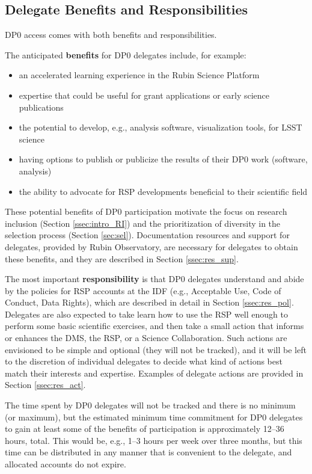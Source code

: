 \documentclass[DM,lsstdraft,authoryear,toc]{lsstdoc}
\begin{document}
\subsection{Delegate Benefits and Responsibilities}\label{ssec:intro_del}

DP0 access comes with both benefits and responsibilities.

The anticipated {\bf benefits} for DP0 delegates include, for example:
\begin{itemize}
\item an accelerated learning experience in the Rubin Science Platform
\item expertise that could be useful for grant applications or early science publications
\item the potential to develop, e.g., analysis software, visualization tools, for LSST science 
\item having options to publish or publicize the results of their DP0 work (software, analysis)
\item the ability to advocate for RSP developments beneficial to their scientific field
\end{itemize}

These potential benefits of DP0 participation motivate the focus on research inclusion (Section \ref{ssec:intro_RI}) and the prioritization of diversity in the selection process (Section \ref{sec:sel}).
Documentation resources and support for delegates, provided by Rubin Observatory, are necessary for delegates to obtain these benefits, and they are described in Section \ref{ssec:res_sup}.

The most important {\bf responsibility} is that DP0 delegates understand and abide by the policies for RSP accounts at the IDF (e.g., Acceptable Use, Code of Conduct, Data Rights), which are described in detail in Section \ref{ssec:res_pol}.
Delegates are also expected to take learn how to use the RSP well enough to perform some basic scientific exercises, and then take a small action that informs or enhances the DMS, the RSP, or a Science Collaboration. 
Such actions are envisioned to be simple and optional (they will not be tracked), and it will be left to the discretion of individual delegates to decide what kind of actions best match their interests and expertise.
Examples of delegate actions are provided in Section \ref{ssec:res_act}.

The time spent by DP0 delegates will not be tracked and there is no minimum (or maximum), but the estimated minimum time commitment for DP0 delegates to gain at least some of the benefits of participation is approximately 12--36 hours, total.
This would be, e.g., 1--3 hours per week over three months, but this time can be distributed in any manner that is convenient to the delegate, and allocated accounts do not expire.
\end{document}
